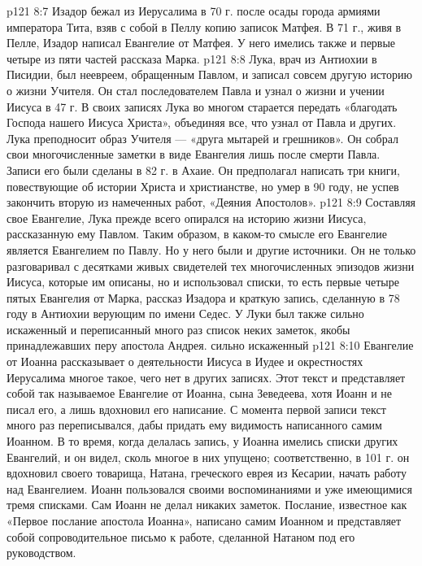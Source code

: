 \vs p121 8:7 Изадор бежал из Иерусалима в 70 г. после осады города армиями императора Тита, взяв с собой в Пеллу копию записок Матфея. В 71 г., живя в Пелле, Изадор написал Евангелие от Матфея. У него имелись также и первые четыре из пяти частей рассказа Марка.
\vs p121 8:8 \pc {}\bibnobreakspace {} Лука, врач из Антиохии в Писидии, был неевреем, обращенным Павлом, и записал совсем другую историю о жизни Учителя. Он стал последователем Павла и узнал о жизни и учении Иисуса в 47 г. В своих записях Лука во многом старается передать «благодать Господа нашего Иисуса Христа», объединяя все, что узнал от Павла и других. Лука преподносит образ Учителя --- «друга мытарей и грешников». Он собрал свои многочисленные заметки в виде Евангелия лишь после смерти Павла. Записи его были сделаны в 82 г. в Ахаие. Он предполагал написать три книги, повествующие об истории Христа и христианстве, но умер в 90 году, не успев закончить вторую из намеченных работ, «Деяния Апостолов».
\vs p121 8:9 Составляя свое Евангелие, Лука прежде всего опирался на историю жизни Иисуса, рассказанную ему Павлом. Таким образом, в каком\hyp{}то смысле его Евангелие является Евангелием по Павлу. Но у него были и другие источники. Он не только разговаривал с десятками живых свидетелей тех многочисленных эпизодов жизни Иисуса, которые им описаны, но и использовал списки, то есть первые четыре пятых Евангелия от Марка, рассказ Изадора и краткую запись, сделанную в 78 году в Антиохии верующим по имени Седес. У Луки был также сильно искаженный и переписанный много раз список неких заметок, якобы принадлежавших перу апостола Андрея. сильно искаженный
\vs p121 8:10 \pc {}\bibnobreakspace {} Евангелие от Иоанна рассказывает о деятельности Иисуса в Иудее и окрестностях Иерусалима многое такое, чего нет в других записях. Этот текст и представляет собой так называемое Евангелие от Иоанна, сына Зеведеева, хотя Иоанн и не писал его, а лишь вдохновил его написание. С момента первой записи текст много раз переписывался, дабы придать ему видимость написанного самим Иоанном. В то время, когда делалась запись, у Иоанна имелись списки других Евангелий, и он видел, сколь многое в них упущено; соответственно, в 101 г. он вдохновил своего товарища, Натана, греческого еврея из Кесарии, начать работу над Евангелием. Иоанн пользовался своими воспоминаниями и уже имеющимися тремя списками. Сам Иоанн не делал никаких заметок. Послание, известное как «Первое послание апостола Иоанна», написано самим Иоанном и представляет собой сопроводительное письмо к работе, сделанной Натаном под его руководством.

